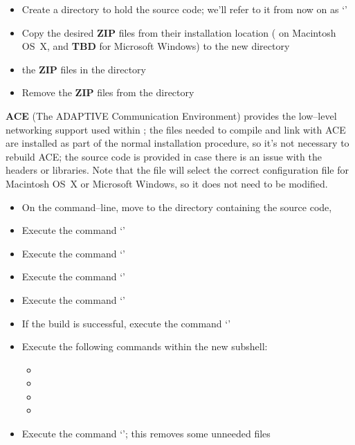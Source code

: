 \tertiaryEnd{}
\secondaryEnd{}
\begin{itemize}
\item Create a directory to hold the source code; we'll refer to it from now on as
`'
\item Copy the desired \textbf{ZIP} files from their installation location
( on Macintosh OS~X, and \textbf{TBD} for Microsoft Windows) to the
new directory 
\item {} the \textbf{ZIP} files in the directory 
\item Remove the \textbf{ZIP} files from the  directory
\end{itemize}
\secondaryEnd{}
\textbf{ACE} (The ADAPTIVE Communication Environment) provides the low--level networking
support used within \mplusm{}; the files needed to compile and link with ACE are installed
as part of the normal \mplusm{} installation procedure, so it's not necessary to rebuild
ACE; the source code is provided in case there is an issue with the headers or libraries.
Note that the file  will select the
correct configuration file for Macintosh OS~X or Microsoft Windows, so it does not need to be
modified.
\begin{itemize}
\item On the command--line, move to the directory containing the \mplusm{} source code,
\item Execute the command `'
\item Execute the command `'
\item Execute the command `'
\item Execute the command `'
\item If the build is successful, execute the command `'
\item Execute the following commands within the new subshell:
\begin{itemize}
\item {}
\item {}
\item {}
\item {}
\end{itemize}
\item Execute the command `'; this removes some unneeded
files
\end{itemize}
